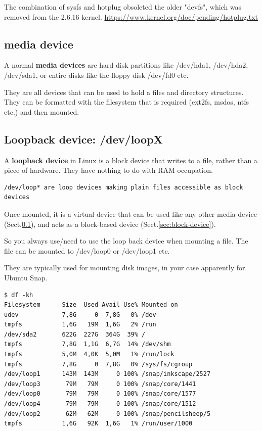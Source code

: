 The combination of sysfs and hotplug obsoleted the older "devfs", which was
removed from the 2.6.16 kernel.
\url{https://www.kernel.org/doc/pending/hotplug.txt}


\subsection{media device}
\label{sec:media-device}

A normal {\bf media devices} are hard disk partitions like /dev/hda1, /dev/hda2,
/dev/sda1, or entire disks like the floppy disk /dev/fd0 etc.

They are all devices that can be used to hold a files and directory structures.
They can be formatted with the filesystem that is required (ext2fs, msdos, ntfs
etc.) and then mounted.

\subsection{Loopback device: /dev/loopX}
\label{sec:loopback-device}

A {\bf loopback device} in Linux is a block device that writes to a file, rather
than a piece of hardware.  They have nothing to do with RAM occupation.
\begin{verbatim}
/dev/loop* are loop devices making plain files accessible as block devices

\end{verbatim}
Once mounted, it  is a virtual device that can be used like any
other media device (Sect.\ref{sec:media-device}), and acts as a block-based
device (Sect.\ref{sec:block-device}).  


So you always use/need to use the loop back device when mounting a file. The
file can be mounted to /dev/loop0 or /dev/loop1 etc.

They are typically used for mounting disk images, in your case apparently for
Ubuntu Snap.
\begin{verbatim}
$ df -kh
Filesystem      Size  Used Avail Use% Mounted on
udev            7,8G     0  7,8G   0% /dev
tmpfs           1,6G   19M  1,6G   2% /run
/dev/sda2       622G  227G  364G  39% /
tmpfs           7,8G  1,1G  6,7G  14% /dev/shm
tmpfs           5,0M  4,0K  5,0M   1% /run/lock
tmpfs           7,8G     0  7,8G   0% /sys/fs/cgroup
/dev/loop1      143M  143M     0 100% /snap/inkscape/2527
/dev/loop3       79M   79M     0 100% /snap/core/1441
/dev/loop0       79M   79M     0 100% /snap/core/1577
/dev/loop4       79M   79M     0 100% /snap/core/1512
/dev/loop2       62M   62M     0 100% /snap/pencilsheep/5
tmpfs           1,6G   92K  1,6G   1% /run/user/1000
\end{verbatim}

